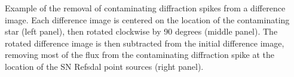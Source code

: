 \label{fig:Despiking}
Example of the removal of contaminating diffraction spikes from a difference image.  Each difference image is centered on the location of the contaminating star (left panel), then rotated clockwise by 90 degrees (middle panel).  The rotated difference image is then subtracted from the initial difference image, removing most of the flux from the contaminating diffraction spike at the location of the SN Refsdal point sources (right panel).